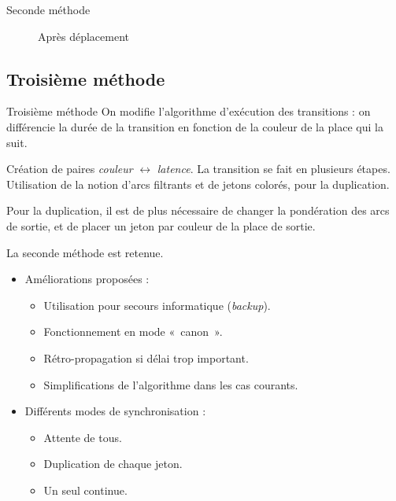\begin{frame}{Seconde méthode}
	\begin{figure}[h!]
		\centering
		\resizebox{11cm}{!}{}
		\caption{Après déplacement}
		\label{fig:deplacementMethode2-2}
	\end{figure}
\end{frame}

\subsection{Troisième méthode}
\begin{frame}{Troisième méthode}
	On modifie l'algorithme d'exécution des transitions : on différencie la durée de la transition en fonction de la couleur de la place qui la suit. 
	
	\begin{itemize}
		\itemar Création de paires \textit{couleur} $\leftrightarrow$ \textit{latence}.
		\itemar La transition se fait en plusieurs étapes.
		\itemar Utilisation de la notion d'arcs filtrants et de jetons colorés, pour la duplication.
	\end{itemize}
	
	Pour la duplication, il est de plus nécessaire de changer la pondération des arcs de sortie, et de placer un jeton par couleur de la place de sortie.
\end{frame}

\begin{frame}
	La seconde méthode est retenue.
	
	\begin{itemize}
		\item[\textbullet] Améliorations proposées : 
			\begin{itemize}
				\item Utilisation pour secours informatique (\textit{backup}).
				\item Fonctionnement en mode «~canon~».
				\item Rétro-propagation si délai trop important.
				\item Simplifications de l'algorithme dans les cas courants.
			\end{itemize}
		\vspace{1em}
		\item[\textbullet] Différents modes de synchronisation : 
			\begin{itemize}
				\item Attente de tous.
				\item Duplication de chaque jeton.
				\item Un seul continue.
			\end{itemize}
	\end{itemize}
\end{frame}